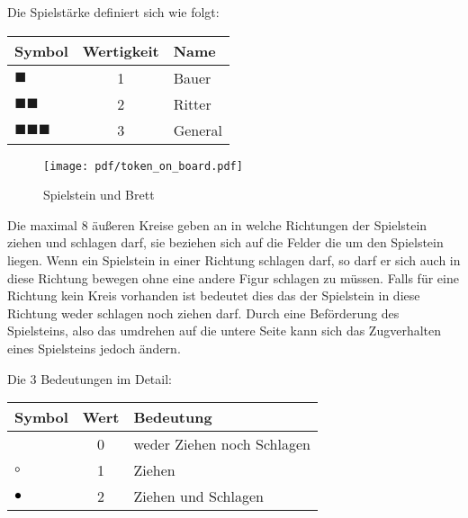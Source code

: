 \documentclass{article}
\begin{document}
	\begin{flushleft}
	Die Spielstärke definiert sich wie folgt:	
	
	\begin{tabular}{lcl}
	\hline
	Symbol & Wertigkeit & Name \\ \hline 
	$\blacksquare$ & 1 & Bauer \\ 
	$\blacksquare\blacksquare$ & 2 & Ritter \\ 
	$\blacksquare\blacksquare\blacksquare$ & 3 & General \\ 
	\end{tabular}
	\end{flushleft}
	
	
	
	\begin{wrapfigure}{r}{6.2cm}
  	\texttt{[image: pdf/token\_on\_board.pdf]}
  	\caption{Spielstein und Brett}
	\end{wrapfigure}
	
	Die maximal 8 äußeren Kreise geben an in welche Richtungen der Spielstein ziehen und 
	schlagen darf, sie beziehen sich auf die Felder die um den Spielstein liegen.
	Wenn ein Spielstein in einer Richtung schlagen darf, so darf er sich auch in 
	diese Richtung bewegen ohne eine andere Figur schlagen zu müssen. Falls für eine
	Richtung kein Kreis vorhanden ist bedeutet dies das der Spielstein in diese Richtung
	weder schlagen noch ziehen darf. Durch eine Beförderung des Spielsteins, also das umdrehen
	auf die untere Seite kann sich das Zugverhalten eines Spielsteins jedoch ändern.
	
	
	\vspace{0.2cm}
	
	\begin{flushleft}
	Die 3 Bedeutungen im Detail: 
	\end{flushleft}
	
	\vspace{0.2cm}
	
	\begin{tabular}{lcl}
	\hline
	Symbol & Wert & Bedeutung  \\  \hline
									& 0 & weder Ziehen noch Schlagen \\
	\textcolor{black}{$\circ$}		& 1 & Ziehen \\ 
	\textcolor{black}{$\bullet$} 	& 2 & Ziehen und Schlagen  \\ 
	\end{tabular}
	 
	\vspace{0.3cm}
    
\end{document}
